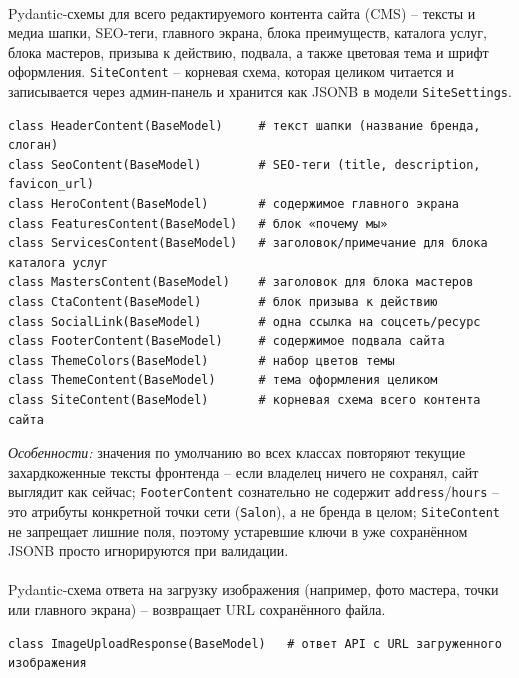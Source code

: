 \paragraph{}
Pydantic-схемы для всего редактируемого контента сайта (CMS) -- тексты и
медиа шапки, SEO-теги, главного экрана, блока преимуществ, каталога
услуг, блока мастеров, призыва к действию, подвала, а также цветовая тема
и шрифт оформления. \texttt{SiteContent} -- корневая схема, которая
целиком читается и записывается через админ-панель и хранится как JSONB
в модели \texttt{SiteSettings}.
\begin{verbatim}
class HeaderContent(BaseModel)     # текст шапки (название бренда, слоган)
class SeoContent(BaseModel)        # SEO-теги (title, description, favicon_url)
class HeroContent(BaseModel)       # содержимое главного экрана
class FeaturesContent(BaseModel)   # блок «почему мы»
class ServicesContent(BaseModel)   # заголовок/примечание для блока каталога услуг
class MastersContent(BaseModel)    # заголовок для блока мастеров
class CtaContent(BaseModel)        # блок призыва к действию
class SocialLink(BaseModel)        # одна ссылка на соцсеть/ресурс
class FooterContent(BaseModel)     # содержимое подвала сайта
class ThemeColors(BaseModel)       # набор цветов темы
class ThemeContent(BaseModel)      # тема оформления целиком
class SiteContent(BaseModel)       # корневая схема всего контента сайта
\end{verbatim}
\textit{Особенности:} значения по умолчанию во всех классах повторяют
текущие захардкоженные тексты фронтенда -- если владелец ничего не
сохранял, сайт выглядит как сейчас; \texttt{FooterContent} сознательно не
содержит \texttt{address}/\texttt{hours} -- это атрибуты конкретной точки
сети (\texttt{Salon}), а не бренда в целом; \texttt{SiteContent} не
запрещает лишние поля, поэтому устаревшие ключи в уже сохранённом JSONB
просто игнорируются при валидации.

\paragraph{}
Pydantic-схема ответа на загрузку изображения (например, фото мастера,
точки или главного экрана) -- возвращает URL сохранённого файла.
\begin{verbatim}
class ImageUploadResponse(BaseModel)   # ответ API с URL загруженного изображения
\end{verbatim}

